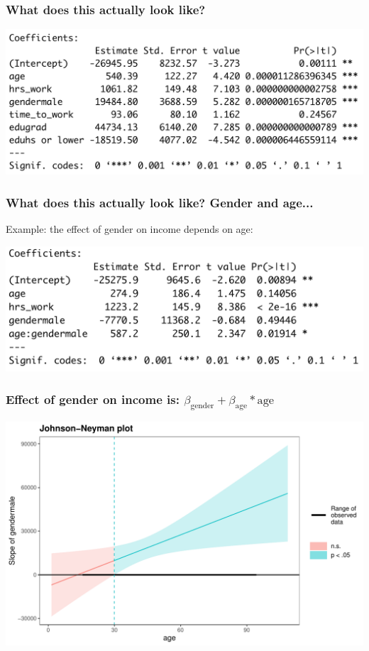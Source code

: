\documentclass[aspectratio=169]{beamer}
\theoremstyle{principle}
\begin{document}
\begin{frame}
\frametitle{What does this actually look like?}

\begin{center}
\includegraphics[scale=0.4]{income_v_age_full.png}
\end{center}

\end{frame}

\begin{frame}
\frametitle{What does this actually look like? Gender and age...}
Example: the effect of gender on income depends on age:
\begin{center}
\includegraphics[scale=0.4]{age_gender_interaction.png}
\end{center}

\end{frame}

\begin{frame}
\frametitle{Effect of gender on income is: $\beta_{\mbox{gender}} + \beta_{\mbox{age}}*\mbox{age}$}
\begin{center}
\includegraphics[scale=0.6]{age_gender.pdf}
\end{center}

\end{frame}
\end{document}
